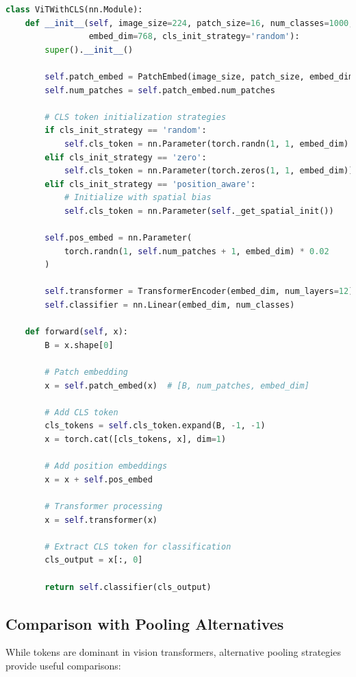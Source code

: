 \begin{lstlisting}[language=Python, caption=CLS token initialization strategies for ViT]
class ViTWithCLS(nn.Module):
    def __init__(self, image_size=224, patch_size=16, num_classes=1000, 
                 embed_dim=768, cls_init_strategy='random'):
        super().__init__()
        
        self.patch_embed = PatchEmbed(image_size, patch_size, embed_dim)
        self.num_patches = self.patch_embed.num_patches
        
        # CLS token initialization strategies
        if cls_init_strategy == 'random':
            self.cls_token = nn.Parameter(torch.randn(1, 1, embed_dim) * 0.02)
        elif cls_init_strategy == 'zero':
            self.cls_token = nn.Parameter(torch.zeros(1, 1, embed_dim))
        elif cls_init_strategy == 'position_aware':
            # Initialize with spatial bias
            self.cls_token = nn.Parameter(self._get_spatial_init())
        
        self.pos_embed = nn.Parameter(
            torch.randn(1, self.num_patches + 1, embed_dim) * 0.02
        )
        
        self.transformer = TransformerEncoder(embed_dim, num_layers=12)
        self.classifier = nn.Linear(embed_dim, num_classes)
    
    def forward(self, x):
        B = x.shape[0]
        
        # Patch embedding
        x = self.patch_embed(x)  # [B, num_patches, embed_dim]
        
        # Add CLS token
        cls_tokens = self.cls_token.expand(B, -1, -1)
        x = torch.cat([cls_tokens, x], dim=1)
        
        # Add position embeddings
        x = x + self.pos_embed
        
        # Transformer processing
        x = self.transformer(x)
        
        # Extract CLS token for classification
        cls_output = x[:, 0]
        
        return self.classifier(cls_output)
\end{lstlisting}

\subsection{Comparison with Pooling Alternatives}

While \cls{} tokens are dominant in vision transformers, alternative pooling strategies provide useful comparisons:

